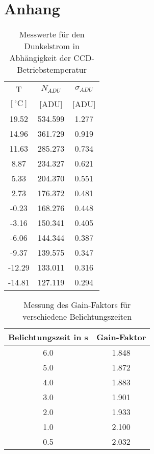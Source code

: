 \section{Anhang}

\begin{table}[h!]
\centering
\begin{tabular}{c c c}
T & $N_{ADU}$ & $\sigma_{ADU}$ \\
$[^\circ \mathrm{C}]$ & [ADU] & [ADU]\\
\hline
19.52	& 534.599	& 1.277\\
14.96	& 361.729	& 0.919\\
11.63	& 285.273	& 0.734\\
8.87	& 234.327	& 0.621\\
5.33	& 204.370	& 0.551\\
2.73	& 176.372	& 0.481\\
-0.23	& 168.276	& 0.448\\
-3.16	& 150.341	& 0.405\\
-6.06	& 144.344	& 0.387\\
-9.37	& 139.575	& 0.347\\
-12.29	& 133.011	& 0.316\\
-14.81	& 127.119	& 0.294\\
\end{tabular}
\caption{Messwerte für den Dunkelstrom in Abhängigkeit der CCD-Betriebstemperatur}
\label{tbl:adu_temp}
\end{table}

\begin{table}[h!]
\centering
\begin{tabular}{c c}
Belichtungszeit in s & Gain-Faktor\\
\hline
6.0 & 1.848\\
5.0 & 1.872\\
4.0 & 1.883\\
3.0	& 1.901\\
2.0 & 1.933\\
1.0 & 2.100\\
0.5	& 2.032\\
\end{tabular}
\caption{Messung des Gain-Faktors für verschiedene Belichtungszeiten}
\label{tbl:gain}
\end{table}

